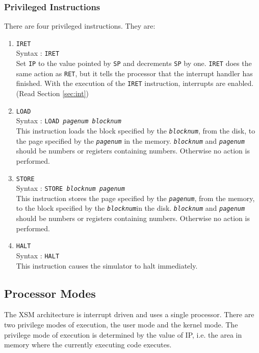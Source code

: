 \documentclass[11pt]{article}
\begin{document}
\subsubsection{Privileged Instructions}
There are four privileged instructions. They are:
\begin{enumerate}

\item \texttt{IRET}\\
Syntax : \texttt{IRET}\\

Set \texttt{IP} to the value pointed by \texttt{SP} and decrements \texttt{SP} by one. \texttt{IRET} does the same action as \texttt{RET}, but it tells the processor that the interrupt handler has finished. With the execution of the \texttt{IRET} instruction, interrupts are enabled. (Read Section \ref{sec:int})

\item \texttt{LOAD}\\
Syntax : \texttt{LOAD \textit{pagenum} \textit{blocknum}}\\
This instruction loads the block specified by the \texttt{\textit{blocknum}}, from the disk, to the page specified by the \texttt{\textit{pagenum}} in the memory. \texttt{\textit{blocknum}} and \texttt{\textit{pagenum}} should be numbers or registers containing numbers. Otherwise no action is performed.

\item \texttt{STORE}\\
Syntax : \texttt{STORE \textit{blocknum} \textit{pagenum} }\\ 
This instruction stores the page specified by the \texttt{\textit{pagenum}}, from the memory, to the block specified by the \texttt{\textit{blocknum}}in the disk. \texttt{\textit{blocknum}} and \texttt{\textit{pagenum}} should be numbers or registers containing numbers. Otherwise no action is performed.

\item \texttt{HALT}\\
Syntax : \texttt{HALT}\\
This instruction causes the simulator to halt immediately.
\end{enumerate}

\subsection{Processor Modes}
The XSM architecture is interrupt driven and uses a single processor. There are two privilege modes of execution, the user mode and the kernel mode. The privilege mode of execution is determined by the value of IP, i.e. the area in memory where the currently executing code executes. 
\end{document}
